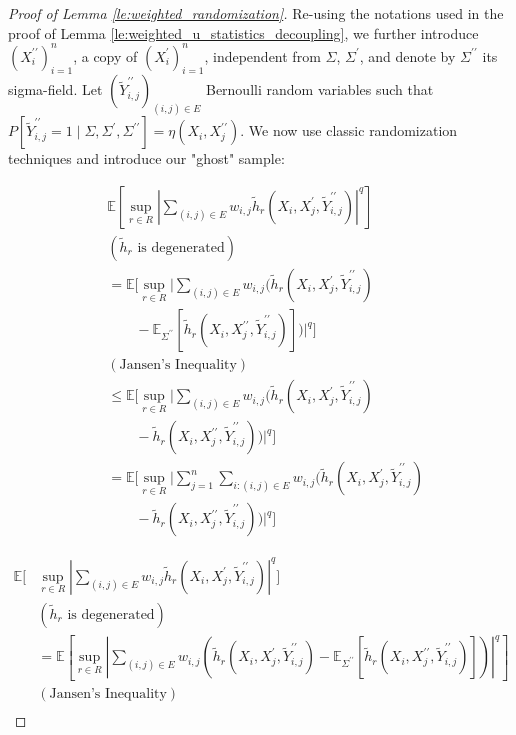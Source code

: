 \documentclass[letterpaper]{article} %
\def\DoubleColumn{}
\def\DoubleColumnEnd{}
\def\SingleColumn{}
\newcommand{\E}{\mathbb{E}}
\newcommand{\Pro}{P}
\newcommand{\pair}[1]{(#1)}
\begin{document}
\begin{proof}[Proof of Lemma \ref{le:weighted_randomization}] %
    Re-using the notations used in the proof of Lemma \ref{le:weighted_u_statistics_decoupling}, we further introduce $(X_i^{\prime\prime})_{i=1}^n$, a copy of $(X_i^\prime)_{i=1}^n$, independent from $\Sigma$, $\Sigma^\prime$, and denote by $\Sigma^{\prime\prime}$ its sigma-field. Let $(\tilde{Y}_{i,j}^{\prime\prime})_{(i,j)\in E}$ Bernoulli random variables such that $\Pro[\tilde{Y}_{i,j}^{\prime\prime}=1\mid \Sigma,\Sigma^\prime,\Sigma^{\prime\prime}]=\eta(X_i,X_j^{\prime\prime})$. We now use classic randomization techniques and introduce our "ghost" sample:
    \DoubleColumn
\begin{align*}
    &\E[\sup_{r\in R}|\sum_{\pair{i,j}\in E} w_{i,j}\tilde{h}_r(X_i,X_j^\prime,\tilde{Y}_{i,j}^{\prime\prime})|^q]\\
    &(\tilde{h}_r \text{ is degenerated})\\
    &= \E[\sup_{r\in R}|\sum_{\pair{i,j}\in E} w_{i,j}(\tilde{h}_r(X_i,X_j^\prime,\tilde{Y}_{i,j}^{\prime\prime})\\
    &\qquad-\E_{\Sigma^{\prime\prime}}[\tilde{h}_r(X_i,X_j^{\prime\prime},\tilde{Y}_{i,j}^{\prime\prime})])|^q]\\
    &(\text{Jansen's Inequality})\\
    &\le \E[\sup_{r\in R}|\sum_{\pair{i,j}\in E} w_{i,j}(\tilde{h}_r(X_i,X_j^\prime,\tilde{Y}_{i,j}^{\prime\prime})\\
    &\qquad-\tilde{h}_r(X_i,X_j^{\prime\prime},\tilde{Y}_{i,j}^{\prime\prime}))|^q]\\
    &= \E[\sup_{r\in R}|\sum_{j=1}^n \sum_{i:\pair{i,j}\in E} w_{i,j}(\tilde{h}_r(X_i,X_j^\prime,\tilde{Y}_{i,j}^{\prime\prime})\\
    &\qquad-\tilde{h}_r(X_i,X_j^{\prime\prime},\tilde{Y}_{i,j}^{\prime\prime}))|^q]
\end{align*}
\DoubleColumnEnd
    \SingleColumn
\begin{align*}
    \E[&\sup_{r\in R}|\sum_{\pair{i,j}\in E} w_{i,j}\tilde{h}_r(X_i,X_j^\prime,\tilde{Y}_{i,j}^{\prime\prime})|^q]\\
    &(\tilde{h}_r \text{ is degenerated})\\
    &= \E[\sup_{r\in R}|\sum_{\pair{i,j}\in E} w_{i,j}(\tilde{h}_r(X_i,X_j^\prime,\tilde{Y}_{i,j}^{\prime\prime})-\E_{\Sigma^{\prime\prime}}[\tilde{h}_r(X_i,X_j^{\prime\prime},\tilde{Y}_{i,j}^{\prime\prime})])|^q]\\
    &(\text{Jansen's Inequality})\\

\end{align*}
\end{proof}
\end{document}
